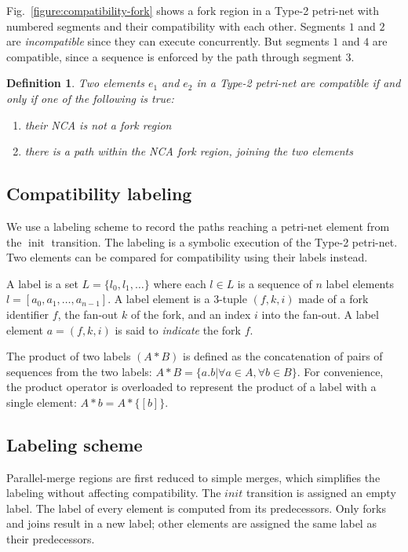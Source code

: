 \documentclass[conference]{IEEEtran}
\newtheorem{definition}{Definition}[section]
\newcommand{\sym}[1]{$\operatorname{#1}$}
\begin{document}
Fig.~\ref{figure:compatibility-fork} shows a fork region in a Type-2
petri-net with numbered segments and their compatibility with each
other. Segments $1$ and $2$ are \emph{incompatible} since they can
execute concurrently. But segments $1$ and $4$ are compatible, since a
sequence is enforced by the path through segment $3$.

\begin{definition} Two elements $e_1$ and $e_2$ in a Type-2 petri-net
are compatible if and only if one of the following is true:
\begin{enumerate}
\item their NCA is {\em not} a fork region
\item there is a path within the NCA fork region, joining the two elements
\end{enumerate}
\end{definition}

\subsection{Compatibility labeling}

We use a labeling scheme to record the paths reaching a petri-net
element from the \sym{init} transition. The labeling is a symbolic
execution of the Type-2 petri-net. Two elements can be compared for
compatibility using their labels instead.

A label is a set $L = \{l_0,l_1,\ldots\}$ where each $l \in L$ is a
sequence of $n$ label elements $l = [a_0,a_1,\ldots,a_{n-1}]$. A label
element is a 3-tuple $(f,k,i)$ made of a fork identifier $f$, the
fan-out $k$ of the fork, and an index $i$ into the fan-out. A label
element $a = (f,k,i)$ is said to {\it indicate} the fork $f$.

The product of two labels $(A * B)$ is
defined as the concatenation of pairs of sequences from the two
labels: $A*B = \{a.b |\forall a \in A, \forall b \in B \}$. For
convenience, the product operator is overloaded to represent the
product of a label with a single element: $A*b = A*\{[b]\}$.

\subsection{Labeling scheme}

Parallel-merge regions are first reduced to simple merges, which
simplifies the labeling without affecting compatibility. The $init$
transition is assigned an empty label. The label of every element is
computed from its predecessors. Only forks and joins result in a new
label; other elements are assigned the same label as their
predecessors.
\end{document}

